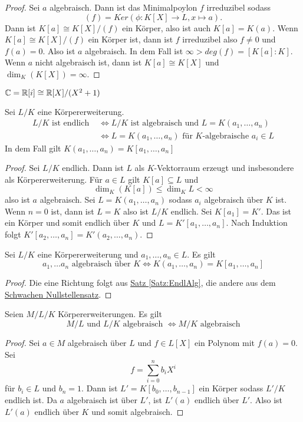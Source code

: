 \begin{proof}
    Sei $a$ algebraisch. Dann ist das Minimalpoylon $f$ irreduzibel sodass 
        $$(f)=Ker(\phi\colon K[X]\to L, x\mapsto a).$$ Dann ist $K[a]\cong K[X]/(f)$ ein Körper, also ist auch $K[a]=K(a)$. 
        Wenn $K[a]\cong K[X]/(f)$ ein Körper ist, dann ist $f$ irreduzibel also $f\neq 0$ und $f(a)=0$. Also ist $a$ algebraisch.
        In dem Fall ist $\infty>deg(f)=[K[a]:K]$.
        Wenn $a$ nicht algebraisch ist, dann ist $K[a]\cong K[X]$ und $\dim_K(K[X])=\infty.$
\end{proof}
\begin{Bsp}
    $\mathbb{C}=\mathbb{R}[i]\cong \mathbb{R}[X]/(X^2+1)$
\end{Bsp}
\begin{Satz}\label{Satz:EndlAlg}
    Sei $L/K$ eine Körpererweiterung.
    \begin{align*}
        L/K\text{ ist endlich } &\iff L/K\text{ ist algebraisch und } L=K(a_1,\dots,a_n)\\
        &\iff L=K(a_1,\dots,a_n) \text{ für $K$-algebraische $a_i\in L$}
    \end{align*}
    In dem Fall gilt $K(a_1,\dots,a_n)=K[a_1,\dots,a_n]$
\end{Satz}
\begin{proof}
    Sei $L/K$ endlich. Dann ist $L$ als $K$-Vektorraum erzeugt und insbesondere als Körpererweiterung. Für $a\in L$ gilt $K[a]\subseteq L$ und $$\dim_K(K[a])\leq\dim_KL<\infty$$ also ist $a$ algebraisch.
    Sei $L=K(a_1,\dots,a_n)$ sodass $a_i$ algebraisch über $K$ ist.
    Wenn $n=0$ ist, dann ist $L=K$ also ist $L/K$ endlich.
    Sei $K[a_1]=K'$. Das ist ein Körper und somit endlich über $K$ und $L=K'[a_1,\dots,a_n]$. Nach Induktion folgt $K'[a_2,\dots,a_n]=K'(a_2,\dots,a_n)$.
\end{proof}
\begin{Kor} Sei $L/K$ eine Körpererweiterung und $a_1,\dots,a_n\in L$. Es gilt
    $$a_1,\dots a_n \text{ algebraisch über }K \iff K(a_1,\dots,a_n)=K[a_1,\dots,a_n]$$
\end{Kor}
\begin{proof}
    Die eine Richtung folgt aus \hyperref[Satz:EndlAlg]{Satz \ref{Satz:EndlAlg}}, die andere aus dem \hyperref[Satz:WeakNst]{Schwachen Nullstellensatz}.
\end{proof}
\begin{Kor}
    Seien $M/L/K$ Körpererweiterungen. Es gilt $$M/L \text{ und }L/K \text{ algebraisch }\iff M/K\text{ algebraisch}$$
\end{Kor}
\begin{proof}
    Sei $a\in M$ algebraisch über $L$ und $f\in L[X]$ ein Polynom mit $f(a)=0$. Sei $$f=\sum\limits_{i=0}^nb_iX^i$$ für $b_i\in L$ und $b_n=1$.
    Dann ist $L'=K[b_0,\dots,b_{n-1}]$ ein Körper sodass $L'/K$ endlich ist.
    Da $a$ algebraisch ist über $L'$, ist $L'(a)$ endlich über $L'$. Also ist $L'(a)$ endlich über $K$ und somit algebraisch.
\end{proof}
